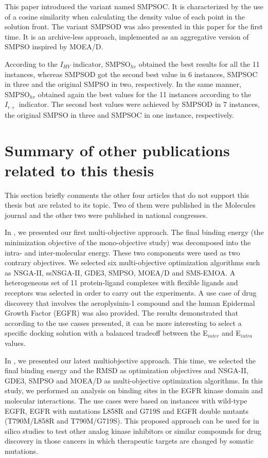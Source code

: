 This paper introduced the variant named SMPSOC. It is characterized by the use of a cosine similarity when calculating the density value of each point in the solution front. The variant SMPSOD was also presented in this paper for the first time. It is an archive-less approach, implemented as an aggregative version of SMPSO inspired by MOEA/D.

According to the $I_{HV}$ indicator, SMPSO$_{hv}$ obtained the best results for all the 11 instances, whereas SMPSOD got the second best value in 6 instances, SMPSOC in three and the original SMPSO in two, respectively. In the same manner, SMPSO$_{hv}$ obtained again the best values for the 11 instances according to the $I_{\epsilon+}$ indicator. The second best values were achieved by SMPSOD in 7 instances, the original SMPSO in three and SMPSOC in one instance, respectively.

\section{Summary of other publications related to this thesis}

This section briefly comments the other four articles that do not support this thesis but are related to its topic. Two of them were published in the Molecules journal and the other two were published in national congresses.

In \cite{Molecules2015}, we presented our first multi-objective approach. The final binding energy (the minimization objective of the mono-objective study) was decomposed into the intra- and inter-molecular energy. These two components were used as two contrary objectives. We selected six multi-objective optimization algorithms such as NSGA-II, ssNSGA-II, GDE3, SMPSO, MOEA/D and SMS-EMOA. A heterogeneous set of 11 protein-ligand complexes with flexible ligands and receptors was selected in order to carry out the experiments. A use case of drug discovery that involves the aeroplysinin-1 compound and the human Epidermal Growth Factor (EGFR) was also provided. The results demonstrated that according to the use casses presented, it can be more interesting to select a specific docking solution with a balanced tradeoff between the E$_{inter}$ and E$_{intra}$ values.

In \cite{Molecules2016}, we presented our latest multiobjective approach. This time, we selected the final binding energy and the RMSD as optimization objectives and NSGA-II, GDE3, SMPSO and MOEA/D as multi-objective optimization algorithms. In this study, we performed an analysis on binding sites in the EGFR kinase domain and molecular interactions. The use cases were based on instances with wild-type EGFR, EGFR with mutations L858R and G719S and EGFR double mutants (T790M/L858R and T790M/G719S). This proposed approach can be used for in silico studies to test other analog kinase inhibitors or similar compounds for drug discovery in those cancers in which therapeutic targets are changed by somatic mutations.

